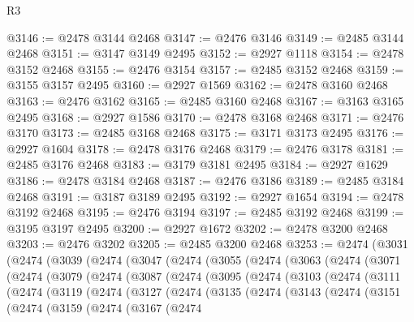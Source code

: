 \begin{lexlean}{R3}
\begin{coremodule}
@3146 := @2478 @3144 @2468
@3147 := @2476 @3146
@3149 := @2485 @3144 @2468
@3151 := @3147 @3149 @2495
@3152 := @2927 @1118
@3154 := @2478 @3152 @2468
@3155 := @2476 @3154
@3157 := @2485 @3152 @2468
@3159 := @3155 @3157 @2495
@3160 := @2927 @1569
@3162 := @2478 @3160 @2468
@3163 := @2476 @3162
@3165 := @2485 @3160 @2468
@3167 := @3163 @3165 @2495
@3168 := @2927 @1586
@3170 := @2478 @3168 @2468
@3171 := @2476 @3170
@3173 := @2485 @3168 @2468
@3175 := @3171 @3173 @2495
@3176 := @2927 @1604
@3178 := @2478 @3176 @2468
@3179 := @2476 @3178
@3181 := @2485 @3176 @2468
@3183 := @3179 @3181 @2495
@3184 := @2927 @1629
@3186 := @2478 @3184 @2468
@3187 := @2476 @3186
@3189 := @2485 @3184 @2468
@3191 := @3187 @3189 @2495
@3192 := @2927 @1654
@3194 := @2478 @3192 @2468
@3195 := @2476 @3194
@3197 := @2485 @3192 @2468
@3199 := @3195 @3197 @2495
@3200 := @2927 @1672
@3202 := @2478 @3200 @2468
@3203 := @2476 @3202
@3205 := @2485 @3200 @2468
@3253 := @2474
    (@3031
      (@2474
        (@3039
          (@2474
            (@3047
              (@2474
                (@3055
                  (@2474
                    (@3063
                      (@2474
                        (@3071
                          (@2474
                            (@3079
                              (@2474
                                (@3087
                                  (@2474
                                    (@3095
                                      (@2474
                                        (@3103
                                          (@2474
                                            (@3111
                                              (@2474
                                                (@3119
                                                  (@2474
                                                    (@3127
                                                      (@2474
                                                        (@3135
                                                          (@2474
                                                            (@3143
                                                              (@2474
                                                                (@3151
                                                                  (@2474
                                                                    (@3159
                                                                      (@2474
                                                                        (@3167
                                                                          (@2474

\end{coremodule}
\end{lexlean}
